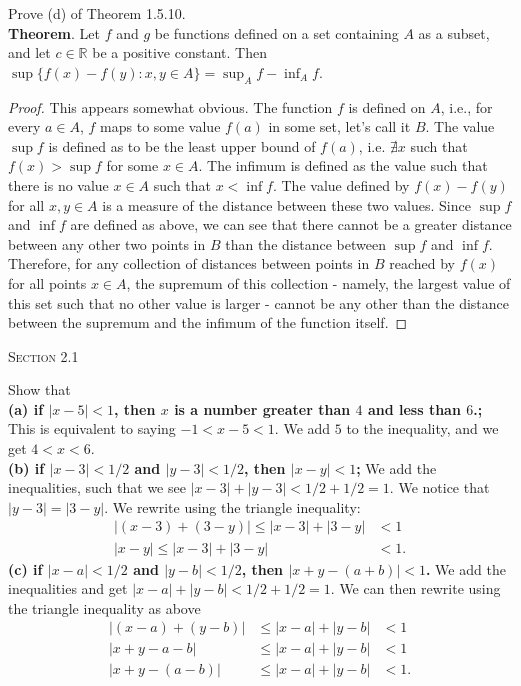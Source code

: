 \documentclass[12pt]{article}
\newenvironment{exercise}[2][Exercise]{\begin{trivlist}
\item[\hskip \labelsep {\bfseries #1}\hskip \labelsep {\bfseries #2.}]}{\end{trivlist}}
\begin{document}
\begin{exercise}{1.5.13}
Prove (d) of Theorem 1.5.10. \\

\textbf{Theorem}. Let $f$ and $g$ be functions defined on a set containing $A$ as a subset, and let $c \in \mathbb{R}$ be a positive constant. Then $\sup \{ f(x) - f(y): x, y \in A \} = \sup_A f - \inf_A f$.
	\begin{proof}
	This appears somewhat obvious. The function $f$ is defined on $A$, i.e., for every $a \in A$, $f$ maps to some value $f(a)$ in some set, let's call it $B$. The value $\sup f$ is defined as to be the least upper bound of $f(a)$, i.e. $\nexists x$ such that $f(x) > \sup f$ for some $x \in A$. The infimum is defined as the value such that there is no value $x \in A$ such that $x < \inf f$. The value defined by $f(x) - f(y)$ for all $x,y \in A$ is a measure of the distance between these two values. Since $\sup f$ and $\inf f$ are defined as above, we can see that there cannot be a greater distance between any other two points in $B$ than the distance between $\sup f$ and $\inf f$. Therefore, for any collection of distances between points in $B$ reached by $f(x)$ for all points $x \in A$, the supremum of this collection - namely, the largest value of this set such that no other value is larger - cannot be any other than the distance between the supremum and the infimum of the function itself.
	\end{proof}
\end{exercise}


\begin{center}
\textsc{\Large Section 2.1}
\end{center}

\begin{exercise}{2.1.1}
Show that \\
\textbf{(a) if $|x - 5| < 1$, then $x$ is a number greater than $4$ and less than $6$.;} 
This is equivalent to saying $-1 < x - 5 < 1$. We add $5$ to the inequality, and we get $4 < x < 6$.\\
\textbf{(b) if $|x - 3| < 1/2$ and $|y - 3| < 1/2$, then $|x - y| < 1$;} We add the inequalities, such that we see $ |x-3| + |y - 3| < 1/2 + 1/2 = 1$. We notice that $|y-3| = |3-y|$. We rewrite using the triangle inequality:
	\begin{align*}
	|(x-3)+(3-y)| \leq |x-3| + |3-y| &< 1 \\
	|x - y| \leq |x-3| + |3-y| &< 1.
	\end{align*}
\textbf{(c) if $|x - a| < 1/2$ and $|y - b| < 1/2$, then $|x + y - (a + b)| < 1$.} We add the inequalities and get $|x-a| + |y-b| < 1/2 + 1/2 =1$. We can then rewrite using the triangle inequality as above
	\begin{align*}
		|(x-a) + (y-b) | &\leq |x-a| + |y-b| & < 1 \\
		|x+y - a-b| &\leq |x-a|+ |y-b| &<1\\
		|x+y - (a-b)|  &\leq |x-a|+ |y-b| &<1.
	\end{align*}
\end{exercise}
\end{document}
